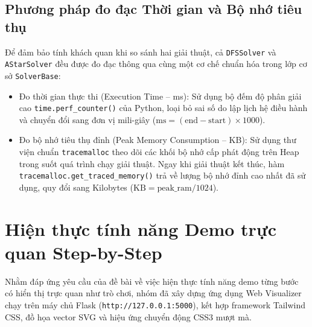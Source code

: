 \documentclass[a4paper]{article}
\begin{document}
\subsection{Phương pháp đo đạc Thời gian và Bộ nhớ tiêu thụ}
Để đảm bảo tính khách quan khi so sánh hai giải thuật, cả \texttt{DFSSolver} và \texttt{AStarSolver} đều được đo đạc thông qua cùng một cơ chế chuẩn hóa trong lớp cơ sở \texttt{SolverBase}:
\begin{itemize}
    \item Đo thời gian thực thi (Execution Time -- ms): Sử dụng bộ đếm độ phân giải cao \texttt{time.perf\_counter()} của Python, loại bỏ sai số do lập lịch hệ điều hành và chuyển đổi sang đơn vị mili-giây ($\text{ms} = (\text{end} - \text{start}) \times 1000$).
    \item Đo bộ nhớ tiêu thụ đỉnh (Peak Memory Consumption -- KB): Sử dụng thư viện chuẩn \texttt{tracemalloc} theo dõi các khối bộ nhớ cấp phát động trên Heap trong suốt quá trình chạy giải thuật. Ngay khi giải thuật kết thúc, hàm \texttt{tracemalloc.get\_traced\_memory()} trả về lượng bộ nhớ đỉnh cao nhất đã sử dụng, quy đổi sang Kilobytes ($\text{KB} = \text{peak\_ram} / 1024$).
\end{itemize}
\newpage

\section{Hiện thực tính năng Demo trực quan Step-by-Step}

Nhằm đáp ứng yêu cầu của đề bài về việc hiện thực tính năng demo từng bước có hiển thị trực quan như trò chơi, nhóm đã xây dựng ứng dụng Web Visualizer chạy trên máy chủ Flask (\texttt{http://127.0.0.1:5000}), kết hợp framework Tailwind CSS, đồ họa vector SVG và hiệu ứng chuyển động CSS3 mượt mà.
\end{document}

